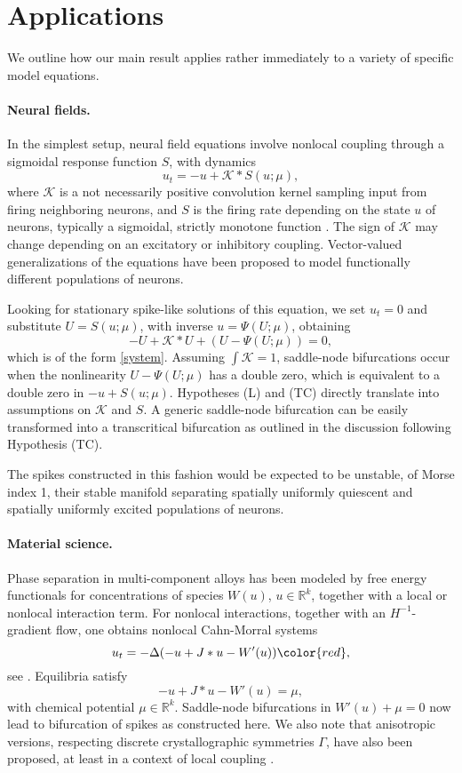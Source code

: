 \documentclass[10pt]{article}
\newcommand{\R}{\mathbb{R}}
\newcommand{\K}{\mathcal{K}}
\begin{document}
\section{Applications}\label{s:app}

We outline how our main result applies rather immediately to a variety of specific model equations. 

\paragraph{Neural fields.}

In the simplest setup, neural field equations involve nonlocal coupling through a sigmoidal response function $S$, with dynamics 
\[
u_t=-u+\K*S(u;\mu),
\]
where $\K$ is a not necessarily positive convolution kernel sampling input from firing neighboring neurons, and $S$ is the firing rate depending on the state $u$ of neurons, typically a sigmoidal, strictly monotone function \cite{neuralfieldrev}. The sign of $\K$ may change depending on an excitatory or inhibitory coupling. Vector-valued generalizations of the equations have been proposed to model functionally different populations of neurons. 

Looking for stationary spike-like solutions of this equation, we set $u_t=0$ and substitute $U=S(u;\mu)$, with inverse $u=\Psi(U;\mu)$, obtaining
\[
-U+\K*U+(U-\Psi(U;\mu))=0,
\]
which is of the form \eqref{system}. Assuming $\int\K=1$, saddle-node bifurcations occur when the nonlinearity $U-\Psi(U;\mu)$ has a double zero, which is equivalent to a double zero in $-u+S(u;\mu)$. Hypotheses (L) and (TC) directly translate into assumptions on $\K$ and $S$. A generic saddle-node bifurcation can be easily transformed into a transcritical bifurcation as outlined in the discussion following Hypothesis (TC). 

The spikes constructed in this fashion would be expected to be unstable, of Morse index 1, their stable manifold separating spatially uniformly quiescent and spatially uniformly excited populations of neurons. 

\paragraph{Material science.} Phase separation in multi-component alloys has been modeled by free energy functionals for concentrations of species $W(u)$, $u\in \R^k$, together with a local or nonlocal interaction term. For nonlocal interactions, together with an $H^{-1}$-gradient flow, one obtains nonlocal Cahn-Morral systems
\[
u_t=-\Delta(-u+J*u-W'(u))\color{red},
\]
see \cite{cahn-morral}. Equilibria satisfy 
\[
-u+J*u-W'(u)=\mu,
\]
with chemical potential $\mu\in\R^k$. Saddle-node bifurcations in $W'(u)+\mu=0$ now lead to bifurcation of spikes as constructed here. We also note that anisotropic versions, respecting discrete crystallographic symmetries $\Gamma$, have also been proposed, at least in a context of local coupling \cite{anisoCH}. 
\end{document}
